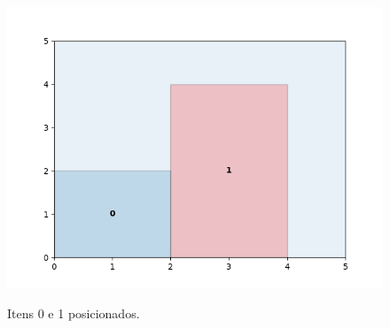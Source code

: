 \begin{figure}[H]
    \centering
    \caption{Itens 0 e 1 posicionados.}
    \includegraphics[scale=0.5]{utils/images/continuous_example}
    \label{fig:sobreposicao-dominio}
\end{figure}
